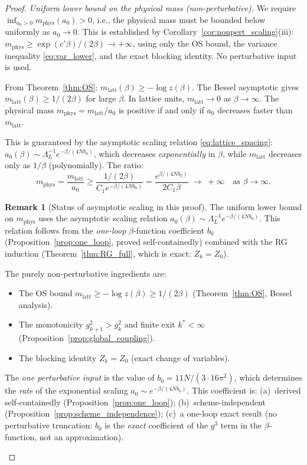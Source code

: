 \documentclass[11pt,a4paper]{amsart}
\theoremstyle{definition}
\newtheorem{remark}[theorem]{Remark}
\begin{document}
\begin{proof}
\emph{Uniform lower bound on the physical mass (non-perturbative).}
We require $\inf_{a_0 > 0} m_{\mathrm{phys}}(a_0) > 0$, i.e., the physical
mass must be bounded below uniformly as $a_0 \to 0$.
This is established by Corollary~\ref{cor:nonpert_scaling}(iii):
$m_{\mathrm{phys}} \ge \exp(c'\beta)/(2\beta) \to +\infty$,
using only the OS bound, the variance inequality \eqref{eq:var_lower},
and the exact blocking identity.  No perturbative input is used.

From Theorem~\ref{thm:OS}: $m_{\mathrm{latt}}(\beta) \ge -\log z(\beta)$.
The Bessel asymptotic gives $m_{\mathrm{latt}}(\beta) \ge 1/(2\beta)$ for
large $\beta$.  In lattice units, $m_{\mathrm{latt}} \to 0$ as $\beta\to\infty$.
The physical mass $m_{\mathrm{phys}} = m_{\mathrm{latt}}/a_0$ is positive
if and only if $a_0$ decreases faster than $m_{\mathrm{latt}}$.

This is guaranteed by the asymptotic scaling relation
\eqref{eq:lattice_spacing}: $a_0(\beta) \sim \Lambda_L^{-1}e^{-\beta/(4Nb_0)}$,
which decreases \emph{exponentially} in $\beta$, while $m_{\mathrm{latt}}$
decreases only as $1/\beta$ (polynomially).  The ratio:
\[
  m_{\mathrm{phys}} = \frac{m_{\mathrm{latt}}}{a_0}
  \ge \frac{1/(2\beta)}{C_1 e^{-\beta/(4Nb_0)}}
  = \frac{e^{\beta/(4Nb_0)}}{2C_1\beta}
  \;\to\; +\infty \quad\text{as }\beta\to\infty.
\]

\begin{remark}[Status of asymptotic scaling in this proof]
\label{rem:scaling_status}
The uniform lower bound on $m_{\mathrm{phys}}$ uses the asymptotic scaling
relation $a_0(\beta) \sim \Lambda_L^{-1} e^{-\beta/(4Nb_0)}$.
This relation follows from the \emph{one-loop} $\beta$-function coefficient
$b_0$ (Proposition~\ref{prop:one_loop}, proved self-containedly) combined
with the RG induction (Theorem~\ref{thm:RG_full}, which is exact: $Z_k = Z_0$).

The purely non-perturbative ingredients are:
\begin{itemize}
\item The OS bound $m_{\mathrm{latt}} \ge -\log z(\beta) \ge 1/(2\beta)$
  (Theorem~\ref{thm:OS}, Bessel analysis).
\item The monotonicity $g^2_{k+1} > g^2_k$ and finite exit $k^* < \infty$
  (Proposition~\ref{prop:global_coupling}).
\item The blocking identity $Z_k = Z_0$ (exact change of variables).
\end{itemize}

The \emph{one perturbative input} is the value of $b_0 = 11N/(3\cdot 16\pi^2)$,
which determines the \emph{rate} of the exponential scaling
$a_0 \sim e^{-\beta/(4Nb_0)}$.  This coefficient is:
(a)~derived self-containedly (Proposition~\ref{prop:one_loop});
(b)~scheme-independent (Proposition~\ref{prop:scheme_independence});
(c)~a one-loop exact result (no perturbative truncation: $b_0$ is the
\emph{exact} coefficient of the $g^3$ term in the $\beta$-function, not an
approximation).


\end{remark}
\end{proof}
\end{document}
